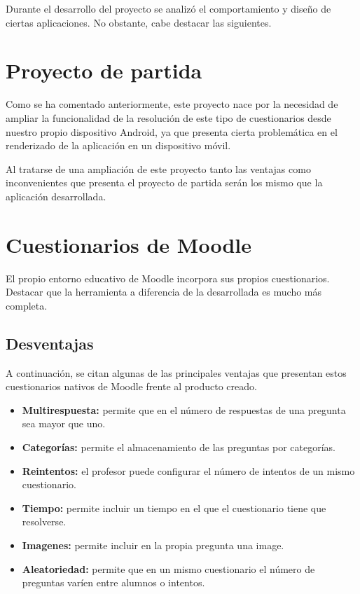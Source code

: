 
Durante el desarrollo del proyecto se analizó el comportamiento y diseño de ciertas aplicaciones. No obstante, cabe destacar las siguientes.

\section{Proyecto de partida}

Como se ha comentado anteriormente, este proyecto nace por la necesidad de ampliar la funcionalidad de la resolución de este tipo de cuestionarios desde nuestro propio dispositivo Android, ya que presenta cierta problemática en el renderizado de la aplicación en un dispositivo móvil.

Al tratarse de una ampliación de este proyecto tanto las ventajas como inconvenientes que presenta el proyecto de partida serán los mismo que la aplicación desarrollada.


\section{Cuestionarios de Moodle}

El propio entorno educativo de Moodle incorpora sus propios cuestionarios. Destacar que la herramienta a diferencia de la desarrollada es mucho más completa. 

\subsection{Desventajas}

A continuación, se citan algunas de las principales ventajas que presentan estos cuestionarios nativos de Moodle frente al producto creado.

\begin{itemize}
	\item \textbf{Multirespuesta:} permite que en el número de respuestas de una pregunta sea mayor que uno.
	
	\item \textbf{Categorías:} permite el almacenamiento de las preguntas por categorías.
	
	\item \textbf{Reintentos:} el profesor puede configurar el número de intentos de un mismo cuestionario.
	
	\item \textbf{Tiempo:} permite incluir un tiempo en el que el cuestionario tiene que resolverse.
	
	\item \textbf{Imagenes:} permite incluir en la propia pregunta una image.
	
	\item \textbf{Aleatoriedad:} permite que en un mismo cuestionario el número de preguntas varíen entre alumnos o intentos.
	
\end{itemize}

